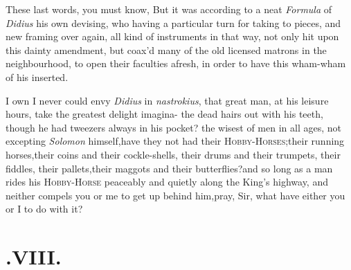 \documentclass{article}
\begin{document}
These last words, you must know,\break
{} 
 But
it was according to a neat \textit{Formula} of \textit{Didius} his own devising, who
having 
a particular turn for taking to pieces,\break
and new framing over again, all kind of\break
instruments in that way, not only hit\break
upon this dainty amendment, but coax’d\break
many of the old licensed matrons in the\break
neighbourhood, to open their faculties\break
afresh, in order to have this wham-wham\break
of his inserted.

I own I never could envy \textit{Didius} in
\textit{nastrokius}, that great man, at his leisure hours, take the
greatest delight imagina-
the dead hairs out with his teeth, though he had tweezers always in
his pocket?
 the wisest of
men in all ages, not excepting \textit{Solomon} himself,\tsk  have
they not had their
\textsc{Hobby-Horses};\tsk  their running
horses,\tsk  their coins and their cockle-shells, their drums and
their trumpets, their fiddles, their pallets,\tsk  their maggots
and their butterflies?\tsk  and so long as a man rides his
\textsc{Hobby-Horse} peaceably and quietly
along the King’s highway, and neither compels you or me to
get up behind him,\tsk  pray, Sir, what have either you or I to do
with it?

\null
\section{.\enspace VIII.}
\end{document}
